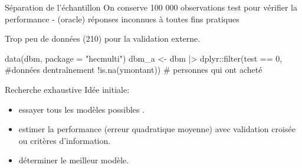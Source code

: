 \documentclass[
  ignorenonframetext,
]{beamer}
\newenvironment{Shaded}{\begin{snugshade}}{\end{snugshade}}
\newcommand{\AttributeTok}[1]{\textcolor[rgb]{0.40,0.45,0.13}{#1}}
\newcommand{\CommentTok}[1]{\textcolor[rgb]{0.37,0.37,0.37}{#1}}
\newcommand{\DecValTok}[1]{\textcolor[rgb]{0.68,0.00,0.00}{#1}}
\newcommand{\FunctionTok}[1]{\textcolor[rgb]{0.28,0.35,0.67}{#1}}
\newcommand{\NormalTok}[1]{\textcolor[rgb]{0.00,0.23,0.31}{#1}}
\newcommand{\OtherTok}[1]{\textcolor[rgb]{0.00,0.23,0.31}{#1}}
\newcommand{\SpecialCharTok}[1]{\textcolor[rgb]{0.37,0.37,0.37}{#1}}
\newcommand{\StringTok}[1]{\textcolor[rgb]{0.13,0.47,0.30}{#1}}
\providecommand{\tightlist}{%
  \setlength{\itemsep}{0pt}\setlength{\parskip}{0pt}}\usepackage{longtable,booktabs,array}
\begin{document}
\begin{frame}[fragile]{Séparation de l'échantillon}
\protect\hypertarget{suxe9paration-de-luxe9chantillon}{}
On conserve 100 000 observations test pour vérifier la performance -
(oracle) réponses inconnues à toutes fins pratiques

Trop peu de données (210) pour la validation externe.

\footnotesize

\begin{Shaded}
\begin{Highlighting}[numbers=left,,]
\FunctionTok{data}\NormalTok{(dbm, }\AttributeTok{package =} \StringTok{"hecmulti"}\NormalTok{)}
\NormalTok{dbm\_a }\OtherTok{\textless{}{-}}\NormalTok{ dbm }\SpecialCharTok{|\textgreater{}}
\NormalTok{  dplyr}\SpecialCharTok{::}\FunctionTok{filter}\NormalTok{(test }\SpecialCharTok{==} \DecValTok{0}\NormalTok{, }\CommentTok{\#données d\textquotesingle{}entraînement}
                \SpecialCharTok{!}\FunctionTok{is.na}\NormalTok{(ymontant)) }
\CommentTok{\# personnes qui ont acheté}
\end{Highlighting}
\end{Shaded}

\normalsize
\end{frame}

\begin{frame}{Recherche exhaustive}
\protect\hypertarget{recherche-exhaustive}{}
Idée initiale:

\begin{itemize}
\tightlist
\item
  essayer tous les modèles possibles .
\item
  estimer la performance (erreur quadratique moyenne) avec validation
  croisée ou critères d'information.
\item
  déterminer le meilleur modèle.
\end{itemize}
\end{frame}
\end{document}
